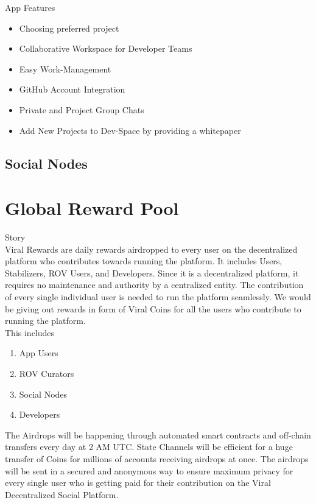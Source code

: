 \documentclass[10pt]{article}
\begin{document}
App Features\\

\begin{itemize}[leftmargin=+0.2in]
\item Choosing preferred project
\item Collaborative Workspace for Developer Teams
\item Easy Work-Management
\item GitHub Account Integration
\item Private and Project Group Chats
\item Add New Projects to Dev-Space by providing a whitepaper
\end{itemize}

\subsection{Social Nodes}


\section{Global Reward Pool}

Story\\

Viral Rewards are daily rewards airdropped to every user on the decentralized platform who contributes towards running the platform. It includes Users, Stabilizers, ROV Users, and Developers. Since it is a decentralized platform, it requires no maintenance and authority by a centralized entity. The contribution of every single individual user is needed to run the platform seamlessly. We would be giving out rewards in form of Viral Coins for all the users who contribute to running the platform.\\

This includes\\
\begin{enumerate}[leftmargin=+0.2in]
\item App Users
\item ROV Curators
\item Social Nodes
\item Developers
\end{enumerate}


The Airdrops will be happening through automated smart contracts and off-chain transfers every day at 2 AM UTC. State Channels will be efficient for a huge transfer of Coins for millions of accounts receiving airdrops at once. The airdrops will be sent in a secured and anonymous way to ensure maximum privacy for every single user who is getting paid for their contribution on the Viral Decentralized Social Platform. \\
\end{document}

